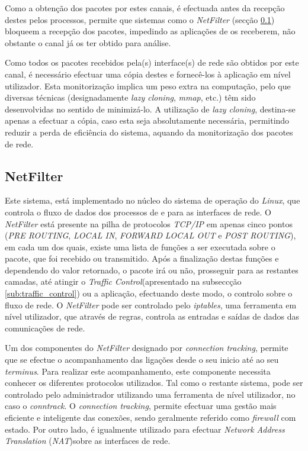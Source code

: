 Como a obtenção dos pacotes por estes canais, é efectuada antes da recepção destes pelos processos, permite que sistemas como o \textit{NetFilter} (secção \ref{sub:netfilter}) bloqueem a recepção dos pacotes, impedindo as aplicações de os receberem, não obstante o canal já os ter obtido para análise.

Como todos os pacotes recebidos pela(s) interface(s) de rede são obtidos por este canal, é necessário efectuar uma cópia destes e fornecê-los à aplicação em nível utilizador.
Esta monitorização implica um peso extra na computação, pelo que diversas técnicas (designadamente \textit{lazy cloning}, \textit{mmap}, etc.) têm sido desenvolvidas no sentido de minimizá-lo.
A utilização de \textit{lazy cloning}, destina-se apenas a efectuar a cópia, caso esta seja absolutamente necessária, permitindo reduzir a perda de eficiência do sistema, aquando da monitorização dos pacotes de rede.




\subsection{NetFilter}
\label{sub:netfilter}
Este sistema, está implementado no núcleo do sistema de operação do \textit{Linux}, que controla o fluxo de dados dos processos de e para as interfaces de rede.
O \textit{NetFilter} está presente na pilha de protocolos \textit{TCP/IP} em apenas cinco pontos (\textit{PRE ROUTING}, \textit{LOCAL IN}, \textit{FORWARD} \textit{LOCAL OUT} e \textit{POST ROUTING}), em cada um dos quais, existe uma lista de funções a ser executada sobre o pacote, que foi recebido ou transmitido.
Após a finalização destas funções e dependendo do valor retornado, o pacote irá ou não, prosseguir para as restantes camadas, até atingir o \textit{Traffic Control}(apresentado na subseccção \ref{sub:traffic_control}) ou a aplicação, efectuando deste modo, o controlo sobre o fluxo de rede.
O \textit{NetFilter} pode ser controlado pelo \textit{iptables}, uma ferramenta em nível utilizador, que através de regras, controla as entradas e saídas de dados das comunicações de rede.

Um dos componentes do \textit{NetFilter} designado por \textit{connection tracking}, permite que se efectue o acompanhamento das ligações desde o seu inicio até ao seu \textit{terminus}.
Para realizar este acompanhamento, este componente necessita conhecer os diferentes protocolos utilizados.
Tal como o restante sistema, pode ser controlado pelo administrador utilizando uma ferramenta de nível utilizador, no caso o \textit{conntrack}.
O \textit{connection tracking}, permite efectuar uma gestão mais eficiente e inteligente das conexões, sendo geralmente referido como \textit{firewall} com estado.
Por outro lado, é igualmente utilizado para efectuar \textit{Network Address Translation} (\textit{NAT})sobre as interfaces de rede.

